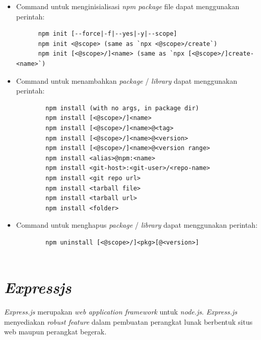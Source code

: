 \begin{itemize}
    \item Command untuk menginisialisasi \textit{npm package} file dapat menggunakan perintah:
    \begin{lstlisting}
      npm init [--force|-f|--yes|-y|--scope]
      npm init <@scope> (same as `npx <@scope>/create`)
      npm init [<@scope>/]<name> (same as `npx [<@scope>/]create-<name>`)
    \end{lstlisting}
    \item Command untuk menambahkan \textit{package} / \textit{library} dapat menggunakan perintah:
    \begin{lstlisting}
        npm install (with no args, in package dir)
        npm install [<@scope>/]<name>
        npm install [<@scope>/]<name>@<tag>
        npm install [<@scope>/]<name>@<version>
        npm install [<@scope>/]<name>@<version range>
        npm install <alias>@npm:<name>
        npm install <git-host>:<git-user>/<repo-name>
        npm install <git repo url>
        npm install <tarball file>
        npm install <tarball url>
        npm install <folder>
    \end{lstlisting}
    \item Command untuk menghapus \textit{package} / \textit{library} dapat menggunakan perintah:
    \begin{lstlisting}
        npm uninstall [<@scope>/]<pkg>[@<version>]
        
    \end{lstlisting}
    
\end{itemize}


\section{\textit{Expressjs}}
\textit{Express.js} merupakan \textit{web application framework} untuk \textit{node.js}. \textit{Express.js} menyediakan \textit{robust feature} dalam pembuatan  perangkat lunak berbentuk situs web maupun perangkat begerak\cite{expressjs:01:about}. 


